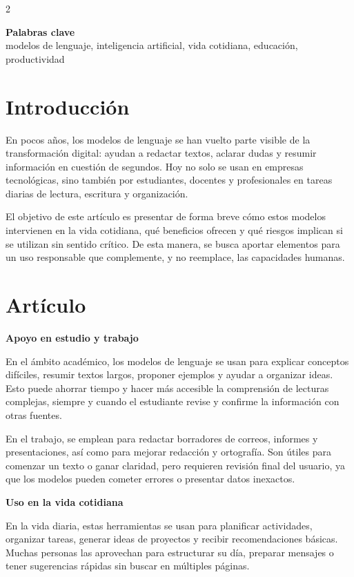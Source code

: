 \documentclass[10pt,spanish,Letterpaper,openany]{book}
\let\origtextbf\textbf
\renewcommand{\textbf}[1]{{\color{textlinetitle}\origtextbf{#1}}}
\begin{document}
\begin {multicols}{2}

\textbf{Palabras clave}\\
modelos de lenguaje, inteligencia artificial, vida cotidiana, educación, productividad

\section{Introducción}\label{introducciuxf3n-13}

En pocos años, los modelos de lenguaje se han vuelto parte visible de la transformación digital: ayudan a redactar textos, aclarar dudas y resumir información en cuestión de segundos. Hoy no solo se usan en empresas tecnológicas, sino también por estudiantes, docentes y profesionales en tareas diarias de lectura, escritura y organización.

El objetivo de este artículo es presentar de forma breve cómo estos modelos intervienen en la vida cotidiana, qué beneficios ofrecen y qué riesgos implican si se utilizan sin sentido crítico. De esta manera, se busca aportar elementos para un uso responsable que complemente, y no reemplace, las capacidades humanas.

\section{Artículo}\label{artuxedculo-8}

\textbf{Apoyo en estudio y trabajo}

En el ámbito académico, los modelos de lenguaje se usan para explicar conceptos difíciles, resumir textos largos, proponer ejemplos y ayudar a organizar ideas. Esto puede ahorrar tiempo y hacer más accesible la comprensión de lecturas complejas, siempre y cuando el estudiante revise y confirme la información con otras fuentes.

En el trabajo, se emplean para redactar borradores de correos, informes y presentaciones, así como para mejorar redacción y ortografía. Son útiles para comenzar un texto o ganar claridad, pero requieren revisión final del usuario, ya que los modelos pueden cometer errores o presentar datos inexactos.

\textbf{Uso en la vida cotidiana}

En la vida diaria, estas herramientas se usan para planificar actividades, organizar tareas, generar ideas de proyectos y recibir recomendaciones básicas. Muchas personas las aprovechan para estructurar su día, preparar mensajes o tener sugerencias rápidas sin buscar en múltiples páginas.


\end{multicols}
\end{document}
